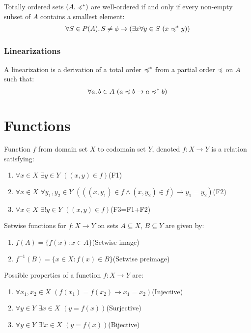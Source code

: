 \documentclass[12pt, a4paper]{article}
\begin{document}
\begin{multicols*}{3}
Totally ordered sets $(A, \preccurlyeq^*)$ are well-ordered if and only if every non-empty subset of $A$ contains a smallest element:
\begin{gather*}
  \forall S \in \powerset(A), S\neq \phi \rightarrow (\exists x \forall y \in S\text{ }(x \curlyleq^* y))
\end{gather*}

\subsubsection{Linearizations}
A linearization is a derivation of a total order $\preccurlyeq^*$ from a partial order $\preccurlyeq$ on $A$ such that:
\begin{gather*}
  \forall a, b \in A\text{ }(a \preccurlyeq b \rightarrow a \preccurlyeq^* b)
\end{gather*}

\colbreak
\section{Functions}
Function $f$ from domain set $X$ to codomain set $Y$, denoted $f:X\rightarrow Y$ is a relation satisfying:
\begin{enumerate}[\roman*.]
  \item $\forall x \in X$ $\exists y \in Y$ $((x,y) \in f)$\hfill(F1)
  \item $\forall x \in X$ $\forall y_1,y_2 \in Y$ $(((x,y_1) \in f \land (x,y_2)\in f) \rightarrow y_1= y_2)$\hfill(F2)
  \item $\forall x \in X$ $\exists! y \in Y$ $((x,y) \in f)$\hfill(F3=F1+F2)
\end{enumerate}

Setwise functions for $f:X\rightarrow Y$ on sets $A \subseteq X$, $B \subseteq Y$ are given by:
\begin{enumerate}[\roman*.]
  \item $f(A) = \{f(x):x\in A\}$\hfill(Setwise image)
  \item $f^{-1}(B) = \{x\in X:f(x) \in B\}$\hfill(Setwise preimage)
\end{enumerate}

Possible properties of a function $f:X\rightarrow Y$ are:
\begin{enumerate}[\roman*.]
  \item $\forall x_1, x_2\in X$ $(f(x_1)=f(x_2)\rightarrow x_1=x_2)$\hfill(Injective)
  \item $\forall y\in Y$ $\exists x \in X$ $(y=f(x))$\hfill(Surjective)
  \item $\forall y\in Y$ $\exists! x \in X$ $(y=f(x))$\hfill(Bijective)
\end{enumerate}


\end{multicols*}
\end{document}
